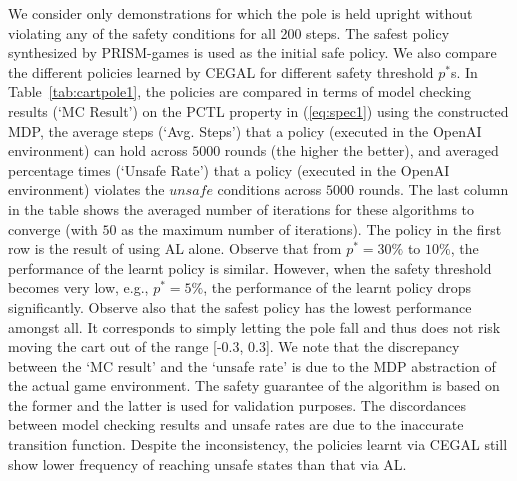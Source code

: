 {We consider only demonstrations for which the pole is held upright without violating any of the safety conditions for all 200 steps. The safest policy synthesized by PRISM-games is used as the initial safe policy. 
 We also compare the different policies learned by CEGAL for different safety threshold $p^*$s. 
In Table~\ref{tab:cartpole1}, the policies are compared in terms of model checking results (`MC Result') on the PCTL property in (\ref{eq:spec1}) using the constructed MDP, the average steps (`Avg. Steps') that a policy (executed in the OpenAI environment) can hold across $5000$ rounds (the higher the better), and averaged percentage times (`Unsafe Rate') that a policy (executed in the OpenAI environment) violates the $unsafe$ conditions across $5000$ rounds. The last column in the table shows the averaged number of iterations for these algorithms to converge (with $50$ as the maximum number of iterations). 
The policy in the first row is the result of using AL alone. 
Observe that from $p^* = 30\%$ to $10\%$, the performance of the learnt policy is similar. However, when the safety threshold becomes very low, e.g., $p^*=5\%$, the performance of the learnt policy drops significantly. 
Observe also that the safest policy has the lowest performance amongst all. 
It corresponds to simply letting the pole fall and thus does not risk moving the cart out of the range [-0.3, 0.3]. 
 We note that the discrepancy between the `MC result' and the `unsafe rate' is due to the MDP abstraction of the actual game environment. The safety guarantee of the algorithm is based on the former and the latter is used for validation purposes. The discordances between model checking results and unsafe rates are due to the inaccurate transition function. Despite the inconsistency, the policies learnt via CEGAL still show lower frequency of reaching unsafe states than that via AL.

}
